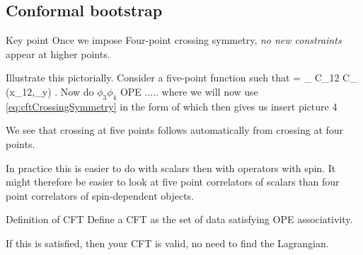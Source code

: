  	\subsection{Conformal bootstrap}
 	\begin{mybox}{Key point}
 	Once we impose Four-point crossing symmetry, \emph{no new constraints} appear at higher points. 
 	\end{mybox}
 Illustrate this pictorially. Consider a five-point function
 	such that
 	\bse 
 	 = \sum_{\mO} C_{12\mO} C_{\mO} (x_{12},\partial_y) .
 	\ese 
 	Now do $\phi_3 \phi_4$ OPE 
 	\bse 
 	.....
 	\ese
 	where we will now use \ref{eq:cftCrossingSymmetry} in the form of
 	which then gives us
 	\bse 
 insert picture 4
 	\ese 
 	\begin{mybox}{}
 	We see that crossing at five points follows automatically from crossing at four points.
 	\end{mybox} 
 In practice this is easier to do with scalars then with operators with spin. It might therefore be easier to look at five point correlators of scalars than four point correlators of spin-dependent objects.
\begin{mybox}{Definition of CFT}
 Define a CFT as the set of data satisfying OPE associativity.
 \end{mybox}
If this is satisfied, then your CFT is valid, no need to find the Lagrangian.
 	
 	

